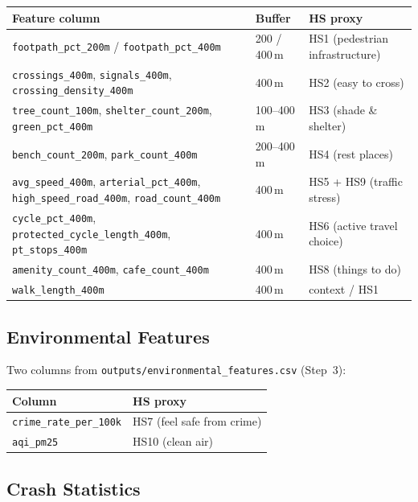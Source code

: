 \documentclass[11pt,a4paper,openany]{book}
\begin{document}
\begin{center}
\begin{tabular}{llL{5cm}}
\toprule
Feature column & Buffer & HS proxy \\
\midrule
\texttt{footpath\_pct\_200m} / \texttt{footpath\_pct\_400m} & 200 / 400\,m & HS1 (pedestrian infrastructure) \\
\texttt{crossings\_400m}, \texttt{signals\_400m}, \texttt{crossing\_density\_400m} & 400\,m & HS2 (easy to cross) \\
\texttt{tree\_count\_100m}, \texttt{shelter\_count\_200m}, \texttt{green\_pct\_400m} & 100--400\,m & HS3 (shade \& shelter) \\
\texttt{bench\_count\_200m}, \texttt{park\_count\_400m} & 200--400\,m & HS4 (rest places) \\
\texttt{avg\_speed\_400m}, \texttt{arterial\_pct\_400m}, \texttt{high\_speed\_road\_400m}, \texttt{road\_count\_400m} & 400\,m & HS5 + HS9 (traffic stress) \\
\texttt{cycle\_pct\_400m}, \texttt{protected\_cycle\_length\_400m}, \texttt{pt\_stops\_400m} & 400\,m & HS6 (active travel choice) \\
\texttt{amenity\_count\_400m}, \texttt{cafe\_count\_400m} & 400\,m & HS8 (things to do) \\
\texttt{walk\_length\_400m} & 400\,m & context / HS1 \\
\bottomrule
\end{tabular}
\end{center}

\subsection{Environmental Features}

Two columns from \texttt{outputs/environmental\_features.csv} (Step~3):

\begin{center}
\begin{tabular}{lL{8cm}}
\toprule
Column & HS proxy \\
\midrule
\texttt{crime\_rate\_per\_100k} & HS7 (feel safe from crime) \\
\texttt{aqi\_pm25} & HS10 (clean air) \\
\bottomrule
\end{tabular}
\end{center}

\subsection{Crash Statistics}
\end{document}
